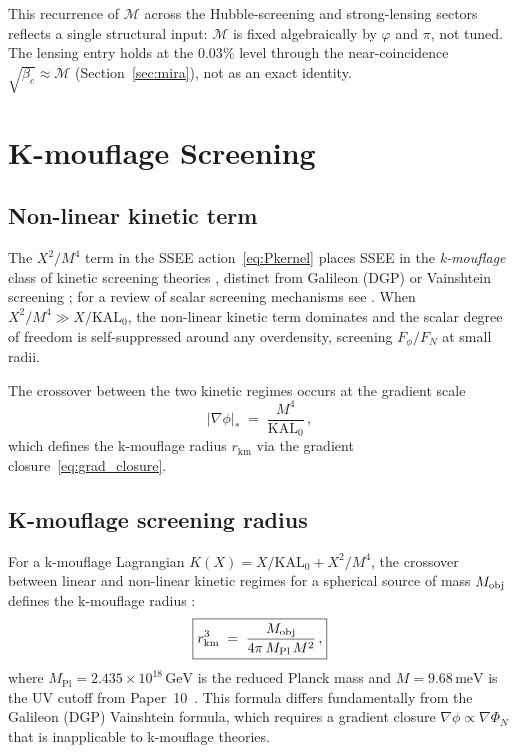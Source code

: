 \documentclass[12pt,a4paper]{article}
\newcommand{\phiG}{\varphi}
\newcommand{\KAL}{\mathrm{KAL}_0}
\newcommand{\MIRA}{\mathcal{M}}
\newcommand{\Mpl}{M_{\mathrm{Pl}}}
\newcommand{\bc}{\beta_c}
\newcommand{\rV}{r_{\mathrm{km}}}
\begin{document}
This recurrence of $\MIRA$ across the Hubble-screening and
strong-lensing sectors reflects a single structural input: $\MIRA$ is fixed
algebraically by $\phiG$ and $\pi$, not tuned. The lensing entry holds at the
$0.03\%$ level through the near-coincidence $\sqrt{\bc}\approx\MIRA$
(Section~\ref{sec:mira}), not as an exact identity.

\section{K-mouflage Screening}
\label{sec:vainshtein}

\subsection{Non-linear kinetic term}

The $X^2/M^4$ term in the SSEE action~\eqref{eq:Pkernel} places SSEE in the
\emph{k-mouflage} class of kinetic screening theories \citep{brax2014},
distinct from Galileon (DGP) \citep{deffayet2001} or Vainshtein
screening \citep{vainshtein1972,babichev2013}; for a review of
scalar screening mechanisms see \citet{Koyama2018}.
When $X^2/M^4 \gg X/\KAL$, the non-linear kinetic term dominates and
the scalar degree of freedom is self-suppressed around any
overdensity, screening $F_\phi/F_N$ at small radii.

The crossover between the two kinetic regimes occurs at the gradient scale
\begin{equation}
  |\nabla\phi|_* \;=\; \frac{M^4}{\KAL}\,,
  \label{eq:grad_vainshtein}
\end{equation}
which defines the k-mouflage radius $\rV$ via the gradient closure~\eqref{eq:grad_closure}.

\subsection{K-mouflage screening radius}
\label{sec:rkm}

For a k-mouflage Lagrangian $K(X) = X/\KAL + X^2/M^4$, the crossover between
linear and non-linear kinetic regimes for a spherical source of mass $M_{\rm obj}$
defines the k-mouflage radius \citep{brax2014}:
\begin{equation}
  \boxed{r_{\rm km}^3 \;=\; \frac{M_{\rm obj}}{4\pi\,\Mpl\,M^2}\,,}
  \label{eq:rkm}
\end{equation}
where $\Mpl = 2.435\times10^{18}\,\mathrm{GeV}$ is the reduced Planck mass
and $M = 9.68\,\mathrm{meV}$ is the UV cutoff from Paper~10~\citep{SSEE10}.
This formula differs fundamentally from the Galileon (DGP) Vainshtein formula,
which requires a gradient closure $\nabla\phi \propto \nabla\Phi_N$ that is
inapplicable to k-mouflage theories.
\end{document}
